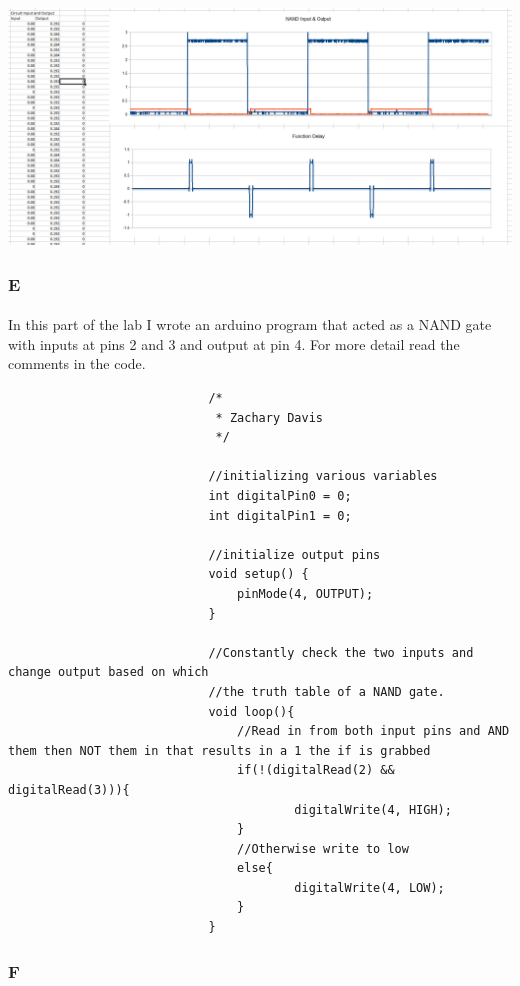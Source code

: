 \documentclass[12pt]{article}
\begin{document}
					\begin{center}
						\includegraphics[scale=0.2]{delay.png}\\
					\end{center}

			\subsubsection{E}
				\paragraph{}
					In this part of the lab I wrote an arduino program that acted as a NAND gate with inputs at pins 2 and 3 and output at pin 4.  For more detail read the 
					comments in the code.

					\begin{center}
						\begin{verbatim}
							/*
							 * Zachary Davis
							 */

							//initializing various variables	
							int digitalPin0 = 0;
							int digitalPin1 = 0;

							//initialize output pins
							void setup() {
  					 			pinMode(4, OUTPUT);
							}

							//Constantly check the two inputs and change output based on which
							//the truth table of a NAND gate.
							void loop(){
								//Read in from both input pins and AND them then NOT them in that results in a 1 the if is grabbed
  								if(!(digitalRead(2) && digitalRead(3))){
    									digitalWrite(4, HIGH);
  								}
								//Otherwise write to low
  								else{
    									digitalWrite(4, LOW);
  								}
							}
						\end{verbatim}
					\end{center}

			\subsubsection{F}
\end{document}

